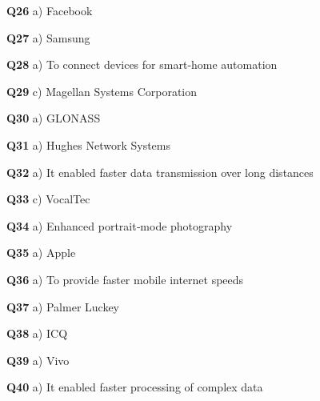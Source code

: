 \textbf{Q26} a) Facebook\par
\textbf{Q27} a) Samsung\par
\textbf{Q28} a) To connect devices for smart‑home automation\par
\textbf{Q29} c) Magellan Systems Corporation\par
\textbf{Q30} a) GLONASS\par
\textbf{Q31} a) Hughes Network Systems\par
\textbf{Q32} a) It enabled faster data transmission over long distances\par
\textbf{Q33} c) VocalTec\par
\textbf{Q34} a) Enhanced portrait‑mode photography\par
\textbf{Q35} a) Apple\par
\textbf{Q36} a) To provide faster mobile internet speeds\par
\textbf{Q37} a) Palmer Luckey\par
\textbf{Q38} a) ICQ\par
\textbf{Q39} a) Vivo\par
\textbf{Q40} a) It enabled faster processing of complex data\par